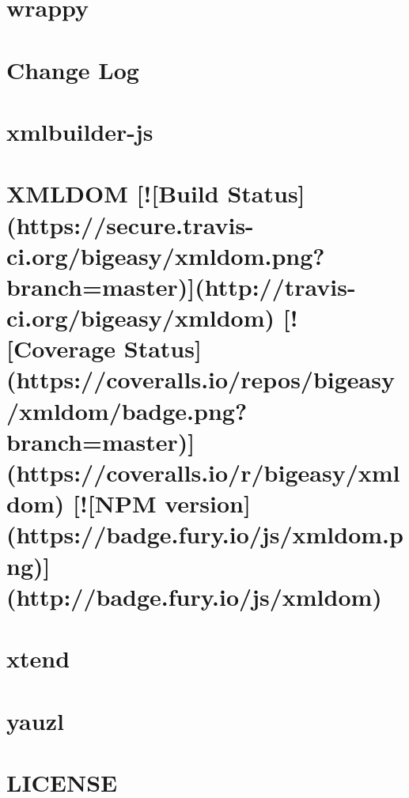 \documentclass[twoside]{book}
\newcommand{\+}{\discretionary{\mbox{\scriptsize$\hookleftarrow$}}{}{}}
\begin{document}
\chapter{wrappy}
\label{md_dsmacc_vis_degree_node_modules_wrappy_README}

\chapter{Change Log}
\label{md_dsmacc_vis_degree_node_modules_xmlbuilder_CHANGELOG}

\chapter{xmlbuilder-\/js}
\label{md_dsmacc_vis_degree_node_modules_xmlbuilder_README}

\chapter{X\+M\+L\+D\+OM \mbox{[}!\mbox{[}Build Status\mbox{]}(https\+://secure.travis-\/ci.org/bigeasy/xmldom.png?branch=master)\mbox{]}(http\+://travis-\/ci.org/bigeasy/xmldom) \mbox{[}!\mbox{[}Coverage Status\mbox{]}(https\+://coveralls.io/repos/bigeasy/xmldom/badge.png?branch=master)\mbox{]}(https\+://coveralls.io/r/bigeasy/xmldom) \mbox{[}!\mbox{[}N\+PM version\mbox{]}(https\+://badge.fury.\+io/js/xmldom.png)\mbox{]}(http\+://badge.fury.\+io/js/xmldom)}
\label{md_dsmacc_vis_degree_node_modules_xmldom_readme}

\chapter{xtend}
\label{md_dsmacc_vis_degree_node_modules_xtend_README}

\chapter{yauzl}
\label{md_dsmacc_vis_degree_node_modules_yauzl_README}

\chapter{L\+I\+C\+E\+N\+SE}
\label{md_LICENSE}

\end{document}
